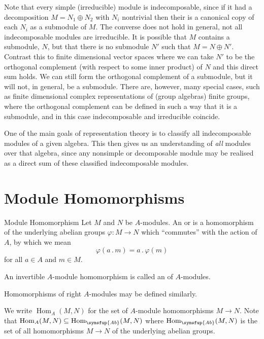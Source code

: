 \documentclass[fleqn]{NotesClass}
\makeatletter
\DeclareMathOperator{\Hom}{Hom}
\newcommand{\action}{\mathbin{.}}
\newcommand{\c@egory}[1]{\symsfup{#1}}
\newcommand{\Ab}{\c@egory{Ab}}
\makeatother
\begin{document}
    Note that every simple (irreducible) module is indecomposable, since if it had a decomposition \(M = N_1 \oplus N_2\) with \(N_i\) nontrivial then their is a canonical copy of each \(N_i\) as a submodule of \(M\).
    The converse does not hold in general, not all indecomposable modules are irreducible.
    It is possible that \(M\) contains a submodule, \(N\), but that there is no submodule \(N'\) such that \(M = N \oplus N'\).
    Contrast this to finite dimensional vector spaces where we can take \(N'\) to be the orthogonal complement (with respect to some inner product) of \(N\) and this direct sum holds.
    We can still form the orthogonal complement of a submodule, but it will not, in general, be a submodule.
    There are, however, many special cases, such as finite dimensional complex representations of (group algebras) finite groups, where the orthogonal complement can be defined in such a way that it is a submodule, and in this case indecomposable and irreducible coincide.
    
    One of the main goals of representation theory is to classify all indecomposable modules of a given algebra.
    This then gives us an understanding of \emph{all} modules over that algebra, since any nonsimple or decomposable module may be realised as a direct sum of these classified indecomposable modules.
    
    \section{Module Homomorphisms}
    \begin{dfn}{Module Homomorphism}{}
        Let \(M\) and \(N\) be \(A\)-modules.
        An  or  is a homomorphism of the underlying abelian groups \(\varphi \colon M \to N\) which \enquote{commutes} with the action of \(A\), by which we mean
        \begin{equation}
            \varphi(a \action m) = a \action \varphi(m)
        \end{equation}
        for all \(a \in A\) and \(m \in M\).
        
        An invertible \(A\)-module homomorphism is called an  of \(A\)-modules.
        
        Homomorphisms of right \(A\)-modules may be defined similarly.
    \end{dfn}
    
    \begin{ntn}{}{}
        We write \(\Hom_A(M, N)\) for the set of \(A\)-module homomorphisms \(M \to N\).
        Note that \(\Hom_A(M, N) \subseteq \Hom_{\Ab}(M, N)\) where \(\Hom_{\Ab}(M, N)\) is the set of all homomorphisms \(M \to N\) of the underlying abelian groups.
    \end{ntn}
    
\end{document}
